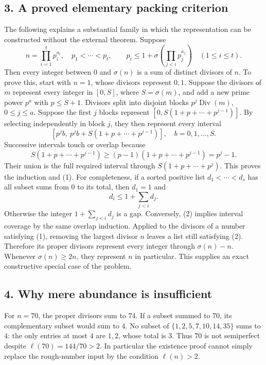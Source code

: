 \subsection*{3. A proved elementary packing criterion}
The following explains a substantial family in which the representation can be constructed without the external theorem. Suppose
\[
 n=\prod_{i=1}^t p_i^{a_i},\quad p_1<\cdots<p_t,
 \qquad p_i\le1+\sigma\left(\prod_{j<i}p_j^{a_j}\right)\quad(1\le i\le t).       \tag{1}
\]
Then every integer between $0$ and $\sigma(n)$ is a sum of distinct divisors of $n$.
To prove this, start with $n=1$, whose divisors represent $0,1$. Suppose the divisors of $m$ represent every integer in $[0,S]$, where $S=\sigma(m)$, and add a new prime power $p^a$ with $p\le S+1$. Divisors split into disjoint blocks $p^j\operatorname{Div}(m)$, $0\le j\le a$. Suppose the first $j$ blocks represent $[0,S(1+p+\cdots+p^{j-1})]$. By selecting independently in block $j$, they then represent every interval
\[
 [p^jb,\ p^jb+S(1+p+\cdots+p^{j-1})],\quad b=0,1,\ldots,S.
\]
Successive intervals touch or overlap because
\[
 S(1+p+\cdots+p^{j-1})\ge(p-1)(1+p+\cdots+p^{j-1})=p^j-1.
\]
Their union is the full required interval through $S(1+p+\cdots+p^j)$. This proves the induction and (1).
For completeness, if a sorted positive list $d_1<\cdots<d_s$ has all subset sums from $0$ to its total, then $d_1=1$ and
\[
 d_i\le1+\sum_{j<i}d_j.                                  \tag{2}
\]
Otherwise the integer $1+\sum_{j<i}d_j$ is a gap. Conversely, (2) implies interval coverage by the same overlap induction. Applied to the divisors of a number satisfying (1), removing the largest divisor $n$ leaves a list still satisfying (2). Therefore its proper divisors represent every integer through $\sigma(n)-n$. Whenever $\sigma(n)\ge2n$, they represent $n$ in particular. This supplies an exact constructive special case of the problem.
\subsection*{4. Why mere abundance is insufficient}
For $n=70$, the proper divisors sum to $74$. If a subset summed to $70$, its complementary subset would sum to $4$. No subset of $\{1,2,5,7,10,14,35\}$ sums to $4$: the only entries at most $4$ are $1,2$, whose total is $3$. Thus $70$ is not semiperfect despite $\ell(70)=144/70>2$. In particular the existence proof cannot simply replace the rough-number input by the condition $\ell(n)>2$.

